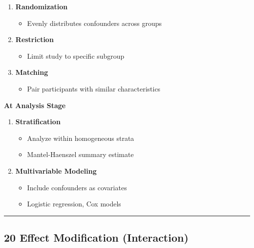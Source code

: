 \documentclass[
  letterpaper,
  DIV=11,
  numbers=noendperiod]{scrartcl}
\providecommand{\tightlist}{%
  \setlength{\itemsep}{0pt}\setlength{\parskip}{0pt}}
\begin{document}
\begin{enumerate}
\def\labelenumi{\arabic{enumi}.}
\tightlist
\item
  \textbf{Randomization}

  \begin{itemize}
  \tightlist
  \item
    Evenly distributes confounders across groups
  \end{itemize}
\item
  \textbf{Restriction}

  \begin{itemize}
  \tightlist
  \item
    Limit study to specific subgroup
  \end{itemize}
\item
  \textbf{Matching}

  \begin{itemize}
  \tightlist
  \item
    Pair participants with similar characteristics
  \end{itemize}
\end{enumerate}

\textbf{At Analysis Stage}

\begin{enumerate}
\def\labelenumi{\arabic{enumi}.}
\setcounter{enumi}{3}
\tightlist
\item
  \textbf{Stratification}

  \begin{itemize}
  \tightlist
  \item
    Analyze within homogeneous strata\\
  \item
    Mantel-Haenszel summary estimate
  \end{itemize}
\item
  \textbf{Multivariable Modeling}

  \begin{itemize}
  \tightlist
  \item
    Include confounders as covariates\\
  \item
    Logistic regression, Cox models
  \end{itemize}
\end{enumerate}

\begin{center}\rule{0.5\linewidth}{0.5pt}\end{center}

\subsection{\texorpdfstring{{20} {Effect Modification
(Interaction)}}{20 Effect Modification (Interaction)}}\label{effect-modification-interaction}
\end{document}
